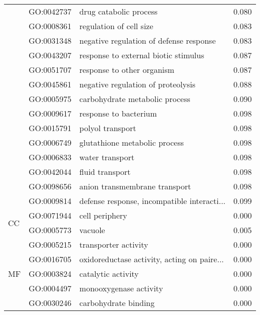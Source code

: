 \begin{longtable}{lllr}
   & GO:0042737 &                       drug catabolic process &         0.080 \\
   & GO:0008361 &                      regulation of cell size &         0.083 \\
   & GO:0031348 &      negative regulation of defense response &         0.083 \\
   & GO:0043207 &         response to external biotic stimulus &         0.087 \\
   & GO:0051707 &                   response to other organism &         0.087 \\
   & GO:0045861 &           negative regulation of proteolysis &         0.088 \\
   & GO:0005975 &               carbohydrate metabolic process &         0.090 \\
   & GO:0009617 &                        response to bacterium &         0.098 \\
   & GO:0015791 &                             polyol transport &         0.098 \\
   & GO:0006749 &                glutathione metabolic process &         0.098 \\
   & GO:0006833 &                              water transport &         0.098 \\
   & GO:0042044 &                              fluid transport &         0.098 \\
   & GO:0098656 &                anion transmembrane transport &         0.098 \\
   & GO:0009814 &  defense response, incompatible interacti... &         0.099 \\
\cline{1-4}
\multirow{2}{*}{CC} & GO:0071944 &                               cell periphery &         0.000 \\
   & GO:0005773 &                                      vacuole &         0.005 \\
\cline{1-4}
\multirow{72}{*}{MF} & GO:0005215 &                         transporter activity &         0.000 \\
   & GO:0016705 &  oxidoreductase activity, acting on paire... &         0.000 \\
   & GO:0003824 &                           catalytic activity &         0.000 \\
   & GO:0004497 &                       monooxygenase activity &         0.000 \\
   & GO:0030246 &                         carbohydrate binding &         0.000 \\

\end{longtable}
